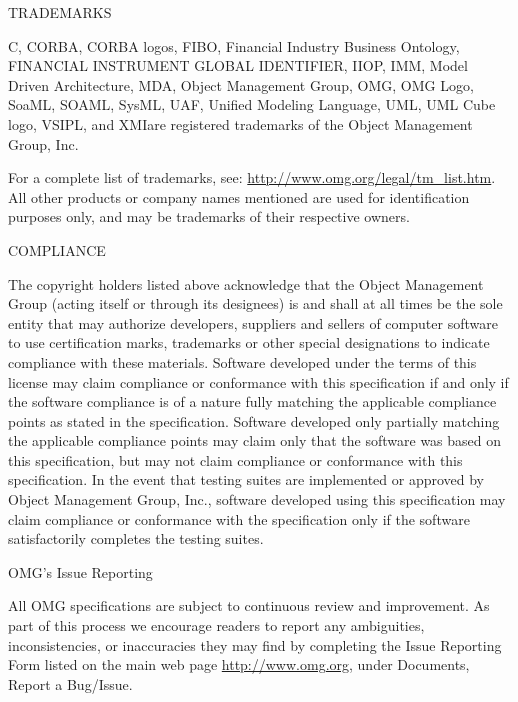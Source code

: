 \documentclass[10pt, a4paper]{isov2}
\newcommand{\rtm}[0]{\small{\textregistered\xspace}}
\newcommand{\OMGparagraph}[1]{
\vspace{23pt}
{\centerline {#1}}
\vspace{3pt}
}
\begin{document}
\OMGparagraph{TRADEMARKS}

C\rtm, CORBA\rtm, CORBA logos\rtm, FIBO\rtm, Financial Industry Business Ontology\rtm, FINANCIAL INSTRUMENT GLOBAL IDENTIFIER\rtm,  IIOP\rtm, IMM\rtm, Model Driven Architecture\rtm, MDA\rtm, Object Management Group\rtm, OMG\rtm, OMG Logo\rtm, SoaML\rtm, SOAML\rtm, SysML\rtm, UAF\rtm, Unified Modeling Language\rtm, UML\rtm, UML Cube logo\rtm, VSIPL\rtm, and XMI\rtm are registered trademarks of the Object Management Group, Inc. 

For a complete list of trademarks, see: \url{http://www.omg.org/legal/tm_list.htm}. All other products or company names mentioned are used for identification purposes only, and may be trademarks of their respective owners.

\OMGparagraph{COMPLIANCE}
The copyright holders listed above acknowledge that the Object Management Group (acting itself or through its designees) is and shall at all times be the sole entity that may authorize developers, suppliers and sellers of computer software to use certification marks, trademarks or other special designations to indicate compliance with these materials.
Software developed under the terms of this license may claim compliance or conformance with this specification if and only if the software compliance is of a nature fully matching the applicable compliance points as stated in the specification. Software developed only partially matching the applicable compliance points may claim only that the software was based on this specification, but may not claim compliance or conformance with this specification. In the event that testing suites are implemented or approved by Object Management Group, Inc., software developed using this specification may claim compliance or conformance with the specification only if the software satisfactorily completes the testing suites.



\newpage 
\OMGparagraph{OMG's Issue Reporting }
All OMG specifications are subject to continuous review and improvement. As part of this process we encourage readers to report any ambiguities, inconsistencies, or inaccuracies they may find by completing the Issue Reporting Form listed on the main web page \url{http://www.omg.org}, under Documents, Report a Bug/Issue. %


\cleardoublepage
\end{document}
